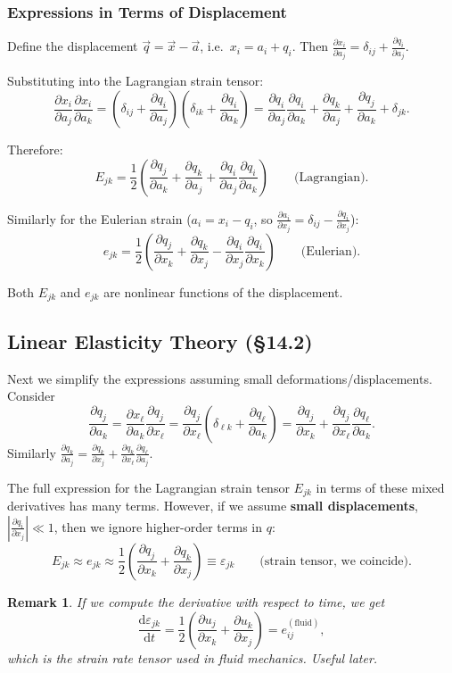 \documentclass[11pt,a4paper]{article}
\newtheorem{remark}[theorem]{Remark}
\newcommand{\pdx}[2]{\frac{\partial #1}{\partial #2}}
\newcommand{\xv}{\vec{x}}
\begin{document}
\subsubsection{Expressions in Terms of Displacement}

Define the displacement $\vec{q} = \xv - \vec{a}$, i.e.\ $x_i = a_i + q_i$. Then $\pdx{x_i}{a_j} = \delta_{ij} + \pdx{q_i}{a_j}$.

Substituting into the Lagrangian strain tensor:
\[
    \pdx{x_i}{a_j}\pdx{x_i}{a_k} = \left(\delta_{ij} + \pdx{q_i}{a_j}\right)\left(\delta_{ik} + \pdx{q_i}{a_k}\right)
    = \pdx{q_i}{a_j}\pdx{q_i}{a_k} + \pdx{q_k}{a_j} + \pdx{q_j}{a_k} + \delta_{jk}.
\]

Therefore:
\[
    \boxed{E_{jk} = \frac{1}{2}\left(\pdx{q_j}{a_k} + \pdx{q_k}{a_j} + \pdx{q_i}{a_j}\pdx{q_i}{a_k}\right)}
    \qquad \text{(Lagrangian)}.
\]

Similarly for the Eulerian strain ($a_i = x_i - q_i$, so $\pdx{a_i}{x_j} = \delta_{ij} - \pdx{q_i}{x_j}$):
\[
    \boxed{e_{jk} = \frac{1}{2}\left(\pdx{q_j}{x_k} + \pdx{q_k}{x_j} - \pdx{q_i}{x_j}\pdx{q_i}{x_k}\right)}
    \qquad \text{(Eulerian)}.
\]

Both $E_{jk}$ and $e_{jk}$ are nonlinear functions of the displacement.

\subsection{Linear Elasticity Theory (\S14.2)}

Next we simplify the expressions assuming small deformations/displacements. Consider
\[
    \pdx{q_j}{a_k} = \pdx{x_\ell}{a_k}\pdx{q_j}{x_\ell}
    = \pdx{q_j}{x_\ell}\left(\delta_{\ell k} + \pdx{q_\ell}{a_k}\right)
    = \pdx{q_j}{x_k} + \pdx{q_j}{x_\ell}\pdx{q_\ell}{a_k}.
\]
Similarly $\pdx{q_k}{a_j} = \pdx{q_k}{x_j} + \pdx{q_k}{x_\ell}\pdx{q_\ell}{a_j}$.

The full expression for the Lagrangian strain tensor $E_{jk}$ in terms of these mixed derivatives has many terms. However, if we assume \textbf{small displacements}, $\left|\pdx{q_i}{x_j}\right| \ll 1$, then we ignore higher-order terms in $q$:
\[
    \boxed{E_{jk} \approx e_{jk} \approx \frac{1}{2}\left(\pdx{q_j}{x_k} + \pdx{q_k}{x_j}\right) \equiv \varepsilon_{jk}}
    \qquad \text{(strain tensor, we coincide).}
\]

\begin{remark}
If we compute the derivative with respect to time, we get
\[
    \frac{\mathrm{d}\varepsilon_{jk}}{\mathrm{d}t} = \frac{1}{2}\left(\pdx{u_j}{x_k} + \pdx{u_k}{x_j}\right) = e_{ij}^{(\text{fluid})},
\]
which is the strain rate tensor used in fluid mechanics. Useful later.
\end{remark}
\end{document}

